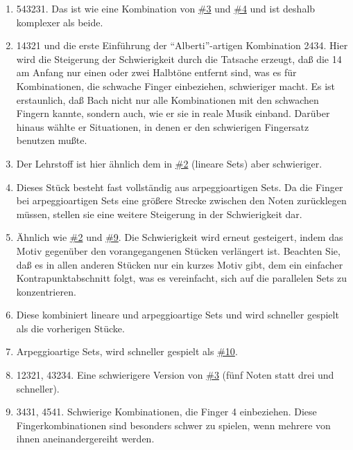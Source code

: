 \begin{enumerate}[label={\arabic*.}]
 \item \hypertarget{c1iii20ps07}{}

543231.
Das ist wie eine Kombination von \hyperref[c1iii20ps03]{\#3} und \hyperref[c1iii20ps04]{\#4} und ist deshalb komplexer als beide.

 \item \hypertarget{c1iii20ps08}{}

14321 und die erste Einführung der \enquote{Alberti}-artigen Kombination 2434.
Hier wird die Steigerung der Schwierigkeit durch die Tatsache erzeugt, daß die 14 am Anfang nur einen oder zwei Halbtöne entfernt sind, was es für Kombinationen, die schwache Finger einbeziehen, schwieriger macht.
Es ist erstaunlich, daß Bach nicht nur alle Kombinationen mit den schwachen Fingern kannte, sondern auch, wie er sie in reale Musik einband.
Darüber hinaus wählte er Situationen, in denen er den schwierigen Fingersatz benutzen mußte.

 \item \hypertarget{c1iii20ps09}{}

Der Lehrstoff ist hier ähnlich dem in \hyperref[c1iii20ps02]{\#2} (lineare Sets) aber schwieriger.

 \item \hypertarget{c1iii20ps10}{}

Dieses Stück besteht fast vollständig aus arpeggioartigen Sets.
Da die Finger bei arpeggioartigen Sets eine größere Strecke zwischen den Noten zurücklegen müssen, stellen sie eine weitere Steigerung in der Schwierigkeit dar.

 \item \hypertarget{c1iii20ps11}{}

Ähnlich wie \hyperref[c1iii20ps02]{\#2} und \hyperref[c1iii20ps09]{\#9}.
Die Schwierigkeit wird erneut gesteigert, indem das Motiv gegenüber den vorangegangenen Stücken verlängert ist.
Beachten Sie, daß es in allen anderen Stücken nur ein kurzes Motiv gibt, dem ein einfacher Kontrapunktabschnitt folgt, was es vereinfacht, sich auf die parallelen Sets zu konzentrieren.

 \item \hypertarget{c1iii20ps12}{}

Diese kombiniert lineare und arpeggioartige Sets und wird schneller gespielt als die vorherigen Stücke.

 \item \hypertarget{c1iii20ps13}{}

Arpeggioartige Sets, wird schneller gespielt als \hyperref[c1iii20ps10]{\#10}.

 \item \hypertarget{c1iii20ps14}{}

12321, 43234.
Eine schwierigere Version von \hyperref[c1iii20ps03]{\#3} (fünf Noten statt drei und schneller).

 \item \hypertarget{c1iii20ps15}{}

3431, 4541.
Schwierige Kombinationen, die Finger 4 einbeziehen.
Diese Fingerkombinationen sind besonders schwer zu spielen, wenn mehrere von ihnen aneinandergereiht werden.
\end{enumerate}

